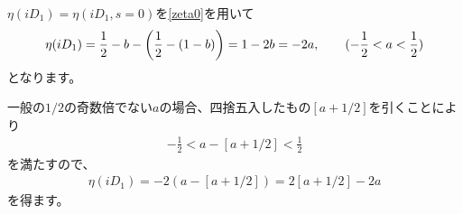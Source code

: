 \documentclass[paper=a4, fontsize=12pt, line_length=16cm, number_of_lines=33,dvipdfmx]{jlreq}
\numberwithin{equation}{section}
\begin{document}
$\eta(iD_1)=\eta(iD_1,s=0)$を\eqref{zeta0}を用いて
\begin{align}
  \eta(iD_1)=\frac12-b-\qty(\frac12 -(1-b))
  =1-2b=-2a,\qquad (-\frac12 < a <\frac12)
\end{align}
となります。

一般の$1/2$の奇数倍でない$a$の場合、四捨五入したもの$[a+1/2]$を引くことにより
\begin{align}
  -\frac12 <a-[a+1/2]<\frac12
\end{align}
を満たすので、
\begin{align}
  \eta(iD_1)=-2(a-[a+1/2])=2[a+1/2]-2a
\end{align}
を得ます。



\end{document}
